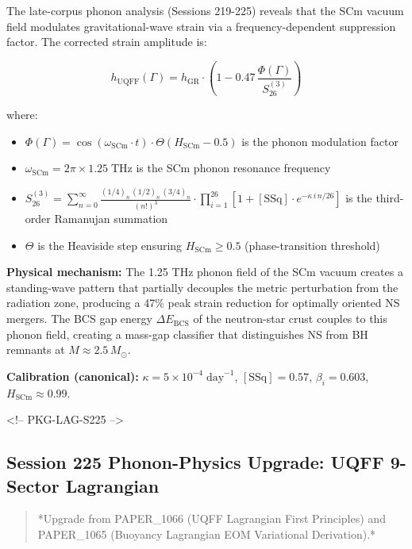 \documentclass[12pt,a4paper]{article}
\begin{document}
The late-corpus phonon analysis (Sessions 219-225) reveals that the SCm vacuum field modulates gravitational-wave strain via a frequency-dependent suppression factor.  The corrected strain amplitude is:

\begin{equation}
h_{\text{UQFF}}(\Gamma) = h_{\text{GR}} \cdot \left(1 - 0.47\,\frac{\Phi(\Gamma)}{S_{26}^{(3)}}\right)
\end{equation}

where:

\begin{itemize}
  \item $\Phi(\Gamma) = \cos(\omega_{\text{SCm}} \cdot t) \cdot \Theta(H_{\text{SCm}} - 0.5)$ is the phonon modulation factor
  \item $\omega_{\text{SCm}} = 2\pi \times 1.25\;\text{THz}$ is the SCm phonon resonance frequency
  \item $S_{26}^{(3)} = \sum_{n=0}^{\infty} \frac{(1/4)_n\,(1/2)_n\,(3/4)_n}{(n!)^3} \cdot \prod_{i=1}^{26}\left[1 + [\text{SSq}]\cdot e^{-\kappa\,i\,n/26}\right]$ is the third-order Ramanujan summation
  \item $\Theta$ is the Heaviside step ensuring $H_{\text{SCm}} \geq 0.5$ (phase-transition threshold)
\end{itemize}

\textbf{Physical mechanism:} The 1.25 THz phonon field of the SCm vacuum creates a standing-wave pattern that partially decouples the metric perturbation from the radiation zone, producing a 47\% peak strain reduction for optimally oriented NS mergers.  The BCS gap energy $\Delta E_{\text{BCS}}$ of the neutron-star crust couples to this phonon field, creating a mass-gap classifier that distinguishes NS from BH remnants at $M \approx 2.5\,M_\odot$.

\textbf{Calibration (canonical):} $\kappa = 5 \times 10^{-4}\;\text{day}^{-1}$, $[\text{SSq}] = 0.57$, $\beta_i = 0.603$, $H_{\text{SCm}} \approx 0.99$.

<!-- PKG-LAG-S225 -->

\subsection{Session 225 Phonon-Physics Upgrade: UQFF 9-Sector Lagrangian}

\begin{quote}
*Upgrade from PAPER\_1066 (UQFF Lagrangian First Principles) and
PAPER\_1065 (Buoyancy Lagrangian EOM Variational Derivation).*
\end{quote}
\end{document}
